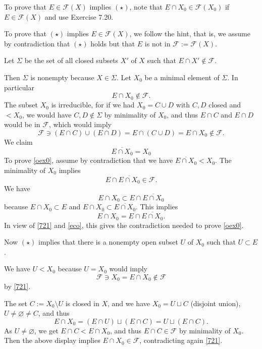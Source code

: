 \documentclass[parskip=half,fontsize=12pt]{scrartcl}%
\begin{document}
To prove that $E\in\mathcal F(X)$ implies $(\star)$, %
note that $E\cap X_0\in\mathcal F(X_0)$ if $E\in\mathcal F(X)$ and use Exercise 7.20.


To prove that $(\star)$ implies $E\in\mathcal F(X)$, %
we follow the hint, that is, we assume by contradiction that $(\star)$ holds but that $E$ is not in $\mathcal F:=\mathcal F(X)$.

Let $\Sigma$ be the set of all closed subsets $X'$ of $X$ such that $E\cap X'\notin\mathcal F$. 

Then $\Sigma$ is nonempty because %
$X\in\Sigma$. Let $X_0$ be a minimal element of $\Sigma$. In particular 
\begin{equation}\label{721}
E\cap X_0\notin\mathcal F.
\end{equation}  
The subset $X_0$ is irreducible, for if we had $X_0=C\cup D$ with $C,D$ closed and $<X_0$, we would have $C,D\notin\Sigma$ by minimality of $X_0$, and thus $E\cap C$ and $E\cap D$ would be in $\mathcal F$, which would imply 
$$
\mathcal F\ni(E\cap C)\cup(E\cap D)=E\cap(C\cup D)=E\cap X_0\notin\mathcal F.
$$ 
We claim 
\begin{equation}\label{oex0}
\overline{E\cap X_0}=X_0
\end{equation}
To prove \eqref{oex0}, assume by contradiction that we have $\overline{E\cap X_0}<X_0$. %
The minimality of $X_0$ implies 
\begin{equation}\label{eco}%
E\cap\overline{E\cap X_0}\in\mathcal F.
\end{equation}
We have 
$$
E\cap X_0\subset E\cap\overline{E\cap X_0}
$$ 
because $E\cap X_0\subset E$ and $E\cap X_0\subset\overline{E\cap X_0}$. This implies 
$$
E\cap X_0=E\cap\overline{E\cap X_0}.
$$ 
In view of \eqref{721} and \eqref{eco}, this gives the contradiction needed to prove \eqref{oex0}.

Now $(\star)$ implies that there is a nonempty open subset $U$ of $X_0$ such that $U\subset E$. 

We have $U<X_0$ because $U=X_0$ would imply 
$$
\mathcal F\ni X_0=E\cap X_0\notin\mathcal F
$$ 
by \eqref{721}. 

The set $C:=X_0\setminus U$ is closed in $X$, and we have $X_0=U\sqcup C$ (disjoint union), $U\ne\varnothing\ne C$, and thus
$$
E\cap X_0=(E\cap U)\sqcup(E\cap C)=U\sqcup(E\cap C).
$$ 
As $U\ne\varnothing$, we get $E\cap C<E\cap X_0$, and thus $E\cap C\in\mathcal F$ by minimality of $X_0$. Then the above display implies $E\cap X_0\in\mathcal F$, contradicting again \eqref{721}.
\end{document}
